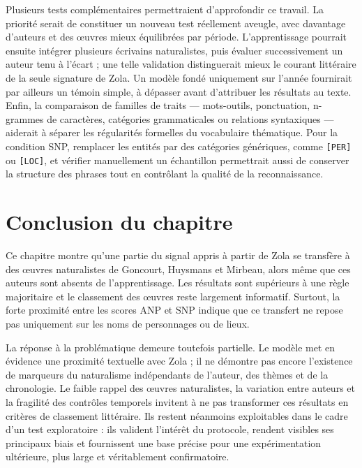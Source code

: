 Plusieurs tests complémentaires permettraient d'approfondir ce travail. La priorité serait de constituer un nouveau test réellement aveugle, avec davantage d'auteurs et des œuvres mieux équilibrées par période. L'apprentissage pourrait ensuite intégrer plusieurs écrivains naturalistes, puis évaluer successivement un auteur tenu à l'écart ; une telle validation distinguerait mieux le courant littéraire de la seule signature de Zola. Un modèle fondé uniquement sur l'année fournirait par ailleurs un témoin simple, à dépasser avant d'attribuer les résultats au texte. Enfin, la comparaison de familles de traits --- mots-outils, ponctuation, n-grammes de caractères, catégories grammaticales ou relations syntaxiques --- aiderait à séparer les régularités formelles du vocabulaire thématique. Pour la condition SNP, remplacer les entités par des catégories génériques, comme \texttt{[PER]} ou \texttt{[LOC]}, et vérifier manuellement un échantillon permettrait aussi de conserver la structure des phrases tout en contrôlant la qualité de la reconnaissance.

\section*{Conclusion du chapitre}

Ce chapitre montre qu'une partie du signal appris à partir de Zola se transfère à des œuvres naturalistes de Goncourt, Huysmans et Mirbeau, alors même que ces auteurs sont absents de l'apprentissage. Les résultats sont supérieurs à une règle majoritaire et le classement des œuvres reste largement informatif. Surtout, la forte proximité entre les scores ANP et SNP indique que ce transfert ne repose pas uniquement sur les noms de personnages ou de lieux.

La réponse à la problématique demeure toutefois partielle. Le modèle met en évidence une proximité textuelle avec Zola ; il ne démontre pas encore l'existence de marqueurs du naturalisme indépendants de l'auteur, des thèmes et de la chronologie. Le faible rappel des œuvres naturalistes, la variation entre auteurs et la fragilité des contrôles temporels invitent à ne pas transformer ces résultats en critères de classement littéraire. Ils restent néanmoins exploitables dans le cadre d'un test exploratoire : ils valident l'intérêt du protocole, rendent visibles ses principaux biais et fournissent une base précise pour une expérimentation ultérieure, plus large et véritablement confirmatoire.
